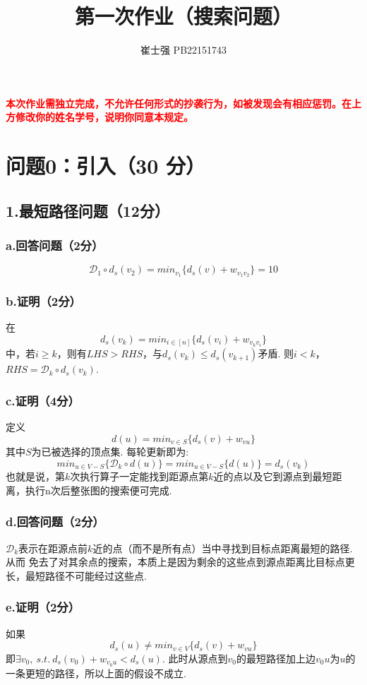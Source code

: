 \documentclass{article}
\title{\bfseries 第一次作业（搜索问题）}
\author{崔士强  \quad  PB22151743}
\begin{document}
\maketitle
\textcolor{red}{\textbf{本次作业需独立完成，不允许任何形式的抄袭行为，如被发现会有相应惩罚。在上方修改你的姓名学号，说明你同意本规定。}}

\section*{问题0：引入（30 分）}
\subsection*{1.最短路径问题（12分）}
\subsubsection*{a.回答问题（2分）}
\[\mathcal{D}_1 \circ d_s(v_2) = min_{v_1}\{d_s(v)+w_{v_1v_2}\} = 10 \]

\subsubsection*{b.证明（2分）}

在
\[d_s(v_k) = min_{i \in [n]}\{d_s(v_i) + w_{v_kv_i}\}\]
中，若$i \geq k$，则有$LHS > RHS$，与$d_s(v_k) \leq d_s(v_{k+1})$矛盾. 
则$i<k$，$RHS = \mathcal{D}_k \circ d_s(v_k)$.

\subsubsection*{c.证明（4分）}
定义
\[d(u) = min_{v \in S}\{d_s(v)+w_{vu}\}\]
其中$S$为已被选择的顶点集.
每轮更新即为:
\[min_{u \in V-S}\{\mathcal{D}_k \circ d(u)\} = min_{u \in V-S}\{d(u)\} = d_s(v_k)\]
也就是说，第$k$次执行算子一定能找到距源点第$k$近的点以及它到源点到最短距离，执行n次后整张图的搜索便可完成.


\subsubsection*{d.回答问题（2分）}
$\mathcal{D}_k$表示在距源点前$k$近的点（而不是所有点）当中寻找到目标点距离最短的路径. 从而
免去了对其余点的搜索，本质上是因为剩余的这些点到源点距离比目标点更长，最短路径不可能经过这些点.

\subsubsection*{e.证明（2分）}
如果 
\[d_s(u) \neq min_{v \in V}\{d_s(v)+w_{vu}\}\]
即$\exists v_0,\ s.t.\ d_s(v_0)+w_{v_0u}<d_s(u)$. 此时从源点到$v_0$的最短路径加上边$v_0u$为$u$的一条更短的路径，所以上面的假设不成立.
\end{document}
